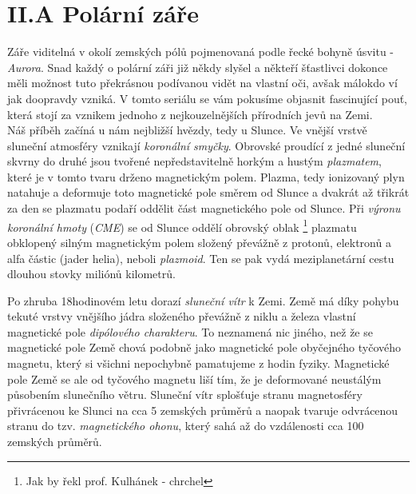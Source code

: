 \documentclass{../../../../style/mkimain}
\begin{document}
\section*{II.A Polární záře}
Záře viditelná v okolí zemských pólů pojmenovaná podle řecké bohyně úsvitu - \emph{Aurora}. 
Snad každý o polární záři již někdy slyšel a někteří šťastlivci dokonce měli možnost 
tuto překrásnou podívanou vidět na vlastní oči, avšak málokdo ví jak doopravdy vzniká. 
V tomto seriálu se vám pokusíme objasnit fascinující pouť, která stojí za vznikem jednoho
 z nejkouzelnějších přírodních jevů na Zemi.  
\\

Náš příběh začíná u nám nejbližší hvězdy, tedy u Slunce. Ve vnější vrstvě sluneční atmosféry 
vznikají \emph{koronální smyčky}. Obrovské  proudící z jedné sluneční skvrny do 
druhé jsou tvořené nepředstavitelně horkým a hustým \emph{plazmatem}, které je v tomto tvaru drženo magnetickým polem.
Plazma, tedy ionizovaný plyn natahuje a deformuje toto magnetické pole směrem od Slunce a 
dvakrát až třikrát za den se plazmatu podaří oddělit část magnetického pole od Slunce. 
Při \emph{výronu koronální hmoty} (\emph{CME}) se od Slunce oddělí obrovský oblak \footnote[1]{Jak by řekl prof. Kulhánek - chrchel} plazmatu obklopený silným 
magnetickým polem složený převážně z protonů, elektronů a alfa částic (jader helia), neboli \emph{plazmoid}.
Ten se pak vydá meziplanetární cestu dlouhou stovky miliónů kilometrů. 

Po zhruba 18hodinovém letu dorazí \emph{sluneční vítr} k Zemi. Země má díky pohybu tekuté vrstvy 
vnějšího jádra složeného převážně z niklu a železa vlastní magnetické pole \emph{dipólového charakteru}.
To neznamená nic jiného, než že se magnetické pole Země chová podobně jako magnetické pole 
obyčejného tyčového magnetu, který si všichni nepochybně pamatujeme z hodin fyziky. Magnetické pole Země
se ale od tyčového magnetu liší tím, že je deformované neustálým působením slunečního větru. Sluneční 
vítr splošťuje stranu magnetosféry přivrácenou ke Slunci na cca 5 zemských průměrů a naopak 
tvaruje odvrácenou stranu do tzv. \emph{magnetického ohonu}, který sahá až do vzdálenosti cca 
100 zemských průměrů.
\end{document}
